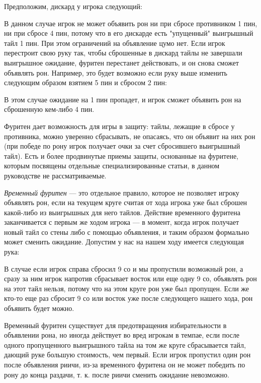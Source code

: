 
Предположим, дискард у игрока следующий:


В данном случае игрок не может объявить рон ни при сбросе противником 1 пин, ни при сбросе 4 пин, потому что в его дискарде есть "упущенный" выигрышный тайл 1 пин. При этом ограничений на объявление цумо нет. Если игрок перестроит свою руку так, чтобы сброшенные в дискард тайлы не завершали выигрышное ожидание, фуритен перестанет действовать, и он снова сможет объявлять рон. Например, это будет возможно если руку выше изменить следующим образом взятием 5 пин и сбросом 2 пин: 


В этом случае ожидание на 1 пин пропадет, и игрок сможет объявить рон на сброшенную кем-либо 4 пин. 

Фуритен дает возможность для игры в защиту: тайлы, лежащие в сбросе у противника, можно уверенно сбрасывать, не опасаясь, что он объявит на них рон (при победе по рону игрок получает очки за счет сбросившего выигрышный тайл). Есть и более продвинутые приемы защиты, основанные на фуритене, которым посвящены отдельные специализированные статьи, в данном руководстве не рассматриваемые.

\textit{Временный фуритен} --- это отдельное правило, которое не позволяет игроку объявлять рон, если на текущем круге считая от хода игрока уже был сброшен какой-либо из выигрышных для него тайлов. Действие временного фуритена заканчивается с первым же ходом игрока --- в момент, когда игрок получает новый тайл со стены либо с помощью объявления, и таким образом формально может сменить ожидание. Допустим у нас на нашем ходу имеется следующая рука:


В случае если игрок справа сбросил 9 со и мы пропустили возможный рон, а сразу за ним игрок напротив сбрасывает восток или еще одну 9 со, объявлять рон на этот тайл нельзя, потому что на этом круге рон уже был пропущен. Если же кто-то еще раз сбросит 9 со или восток уже после следующего нашего хода, рон объявить будет можно.

Временный фуритен существует для предотвращения избирательности в объявлении рона, но иногда действует во вред игрокам в темпае, если после одного пропущенного выигрышного тайла на том же круге сбрасывается тайл, дающий руке большую стоимость, чем первый. Если игрок пропустил один рон после объявления риичи, из-за временного фуритена он не может победить по рону до конца раздачи, т. к. после риичи сменить ожидание невозможно.

